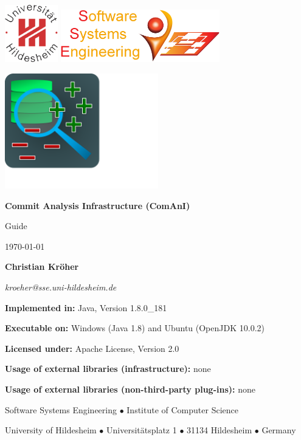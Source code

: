 \begin{titlepage}
\centering

{\includegraphics[height=2.5cm]{inserts/suh_logo.jpg} \hfill \includegraphics[height=2.3cm]{inserts/sse_logo.png}}\par\vspace{3cm}
\includegraphics[height=5cm,trim={0cm 3,4cm 9,7cm 0cm},clip]{inserts/comani_logo.pdf}\par\vspace{1cm}
{\Huge \textbf{Commit Analysis Infrastructure \newline (ComAnI)}}\par\vspace{1.5cm}
{\Huge Guide}\par\vspace{5mm}
{\Large \today}\par\vspace{1.5cm}
{\Large \textbf{Christian Kröher}}\par
{\Large \textit{kroeher@sse.uni-hildesheim.de}}\par\vspace{1.5cm}
{\textbf{Implemented in:} Java, Version 1.8.0\_181}\par
{\textbf{Executable on:} Windows (Java 1.8) and Ubuntu (OpenJDK 10.0.2)}\par
{\textbf{Licensed under:} Apache License, Version 2.0}\par
{\textbf{Usage of external libraries (infrastructure):} none}\par
{\textbf{Usage of external libraries (non-third-party plug-ins):} none}\par
\vfill
{Software Systems Engineering $\bullet$ Institute of Computer Science}\par
{University of Hildesheim $\bullet$ Universit\"atsplatz 1 $\bullet$ 31134 Hildesheim $\bullet$ Germany}\par
\end{titlepage}